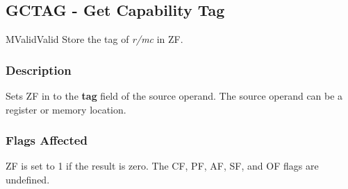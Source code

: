 \clearpage
{}
{}
\subsection*{GCTAG - Get Capability Tag}

\begin{x86opcodetable}
  {M}{Valid}{Valid}
  {Store the tag of \emph{r/mc} in ZF.}
\end{x86opcodetable}

\begin{x86opentable}
\end{x86opentable}

\subsubsection*{Description}

Sets ZF in \RFLAGS{} to the \textbf{tag} field of the source
operand.  The source operand can be a register or memory location.

\subsubsection*{Flags Affected}

ZF is set to 1 if the result is zero.  The CF, PF, AF, SF, and OF
flags are undefined.
